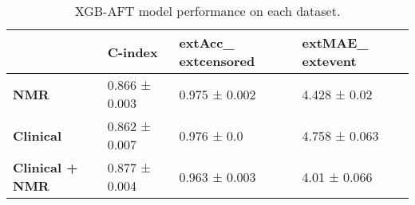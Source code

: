 \begin{table}
\caption{XGB-AFT model performance on each dataset.}
\label{tab:results_ex2}
\begin{tabular}{llll}
\toprule
 & C-index & 	ext{Acc}_{	ext{censored}} & 	ext{MAE}_{	ext{event}} \\
\midrule
\textbf{NMR} & 0.866 ± 0.003 & 0.975 ±                 0.002 & 4.428 ± 0.02 \\
\textbf{Clinical} & 0.862 ± 0.007 & 0.976 ±                 0.0 & 4.758 ± 0.063 \\
\textbf{Clinical + NMR} & 0.877 ± 0.004 & 0.963 ±                 0.003 & 4.01 ± 0.066 \\
\bottomrule
\end{tabular}
\end{table}
